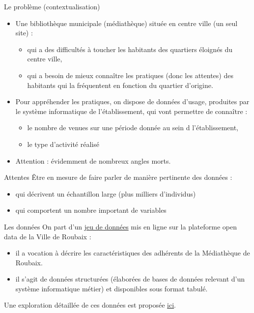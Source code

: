 \documentclass{beamer}
\begin{document}
\begin{frame}{Le problème (contextualisation)}
	\begin{itemize}
    	\item Une bibliothèque municipale (médiathèque) située en centre ville (un seul site) :
    	\begin{itemize}
    		\item qui a des difficultés à toucher les habitants des quartiers éloignés du centre ville,
    		\item qui a besoin de mieux connaître les pratiques (donc les attentes) des habitants qui la fréquentent en fonction du quartier d’origine.
    	\end{itemize}
    	\item Pour appréhender les pratiques, on dispose de données d’usage, produites par le système informatique de l’établissement, qui vont permettre de connaître :
    	\begin{itemize}
    		\item le nombre de venues sur une période donnée au sein d l’établissement,
    		\item le type d’activité réalisé
    	\end{itemize}
    	\item Attention : évidemment de nombreux angles morts.
	\end{itemize}
\end{frame}

\begin{frame}{Attentes}
	Être en mesure de faire parler de manière pertinente des données :
	\begin{itemize}
		\item qui décrivent un échantillon large (plus milliers d’individus)
		\item qui comportent un nombre important de variables
	\end{itemize}
\end{frame}

\begin{frame}{Les données}
	On part d'un \href{https://opendata.roubaix.fr/explore/dataset/caracteristiques_adherents_2018}{jeu de données} mis en ligne sur la plateforme open data de la Ville de Roubaix :
	\begin{itemize}
		\item il a vocation à décrire les caractéristiques des adhérents de la Médiathèque de Roubaix.
		\item il s'agit de données structurées (élaborées de bases de données relevant d'un système informatique métier) et disponibles sous format tabulé.
	\end{itemize}
	Une exploration détaillée de ces données est proposée \href{https://github.com/ragbx/aqm/blob/master/01_presentation_donnees.ipynb}{ici}.
\end{frame}
\end{document}
